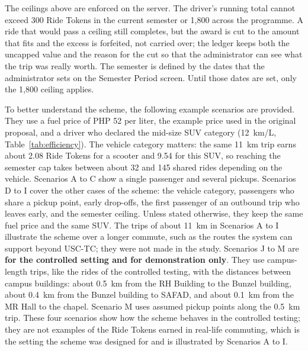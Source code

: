 The ceilings above are enforced on the server. The driver's running total cannot exceed 300 Ride Tokens in the current semester or 1,800 across the programme. A ride that would pass a ceiling still completes, but the award is cut to the amount that fits and the excess is forfeited, not carried over; the ledger keeps both the uncapped value and the reason for the cut so that the administrator can see what the trip was really worth. The semester is defined by the dates that the administrator sets on the Semester Period screen. Until those dates are set, only the 1,800 ceiling applies.

\vspace{1em}

To better understand the scheme, the following example scenarios are provided. They use a fuel price of PHP 52 per liter, the example price used in the original proposal, and a driver who declared the mid-size SUV category (12~km/L, Table~\ref{tab:efficiency}). The vehicle category matters: the same 11~km trip earns about 2.08 Ride Tokens for a scooter and 9.54 for this SUV, so reaching the semester cap takes between about 32 and 145 shared rides depending on the vehicle. Scenarios A to C show a single passenger and several pickups. Scenarios D to I cover the other cases of the scheme: the vehicle category, passengers who share a pickup point, early drop-offs, the first passenger of an outbound trip who leaves early, and the semester ceiling. Unless stated otherwise, they keep the same fuel price and the same SUV. The trips of about 11~km in Scenarios A to I illustrate the scheme over a longer commute, such as the routes the system can support beyond USC-TC; they were not made in the study. Scenarios J to M are \textbf{for the controlled setting and for demonstration only}. They use campus-length trips, like the rides of the controlled testing, with the distances between campus buildings: about 0.5~km from the RH Building to the Bunzel building, about 0.4~km from the Bunzel building to SAFAD, and about 0.1~km from the MR Hall to the chapel. Scenario M uses assumed pickup points along the 0.5~km trip. These four scenarios show how the scheme behaves in the controlled testing; they are not examples of the Ride Tokens earned in real-life commuting, which is the setting the scheme was designed for and is illustrated by Scenarios A to I.

